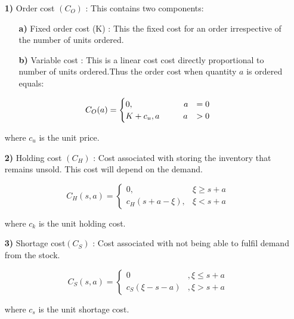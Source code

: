 \documentclass[11pt,a4paper,oneside]{report}
\begin{document}
\begin{enumerate}
\item[\textbf{1)}] Order cost $(C_O)$ : This contains two components:
\begin{enumerate}
\item[\textbf{a)}] Fixed order cost (K) : This the fixed cost for an order irrespective of the number of units ordered.
\item[\textbf{b)}] Variable cost : This is a linear cost cost directly proportional to number of units ordered.Thus the order cost when quantity $a$  is ordered equals:\\
\end{enumerate}
\begin{equation*}
C_O(a) = 
\begin{cases}
0,   \hspace{2.12cm}          a&=0\\
K+ c_u, {a}     \hspace{1cm}           a&>0
\end{cases}
\end{equation*}

\hspace{6mm} where  $c_u$  is the unit price.

\item[\textbf{2)}]Holding cost $(C_H)$ : Cost associated with storing the inventory that remains unsold. This cost will depend on the demand.

\begin{equation*}
C_H(s,a) = 
\begin{cases}
0,   &\xi \geq s+a\\
c_H(s+a-\xi),     & \xi <s+a
\end{cases}
\end{equation*}
\begin{flushleft}where $c_k$ is the unit holding cost.
\end{flushleft}

\item[\textbf{3)}]	Shortage cost$(C_S)$ : Cost associated with not being able to fulfil demand from the stock. 

\begin{equation*}
C_S(s,a) = 
\begin{cases}
0          &,\xi \leq s+a\\
c_S(\xi-s-a)     &  ,\xi >s+a
\end{cases}
\end{equation*}
\begin{flushleft}where $c_s$ is the unit shortage cost.
\end{flushleft}
\end{enumerate}
\end{document}
